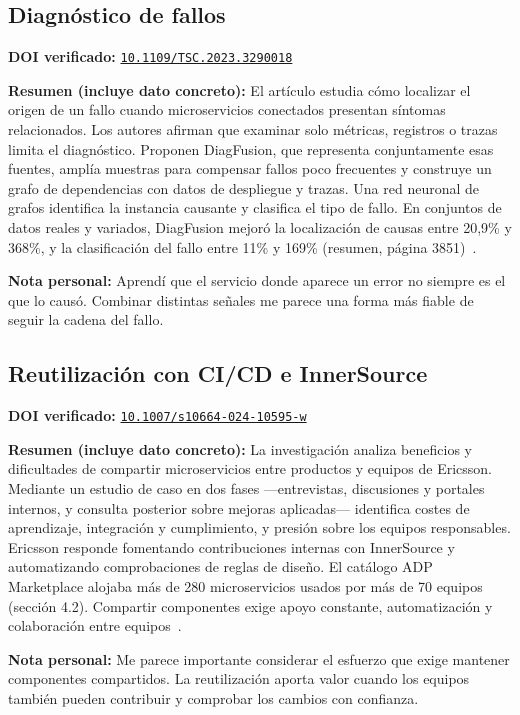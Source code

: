 \documentclass[12pt,a4paper]{article}
\begin{document}
\subsection{Diagnóstico de fallos}
\noindent\textbf{DOI verificado:} \href{https://doi.org/10.1109/TSC.2023.3290018}{\nolinkurl{10.1109/TSC.2023.3290018}}\par
\noindent\textbf{Resumen (incluye dato concreto):} El artículo estudia cómo localizar el origen de un fallo cuando microservicios conectados presentan síntomas relacionados. Los autores afirman que examinar solo métricas, registros o trazas limita el diagnóstico. Proponen DiagFusion, que representa conjuntamente esas fuentes, amplía muestras para compensar fallos poco frecuentes y construye un grafo de dependencias con datos de despliegue y trazas. Una red neuronal de grafos identifica la instancia causante y clasifica el tipo de fallo. En conjuntos de datos reales y variados, DiagFusion mejoró la localización de causas entre 20,9\% y 368\%, y la clasificación del fallo entre 11\% y 169\% (resumen, página 3851)~\cite{ZhangJinLinSunZhangXia2023}.\par
\noindent\textbf{Nota personal:} Aprendí que el servicio donde aparece un error no siempre es el que lo causó. Combinar distintas señales me parece una forma más fiable de seguir la cadena del fallo.\par

\subsection{Reutilización con CI/CD e InnerSource}
\noindent\textbf{DOI verificado:} \href{https://doi.org/10.1007/s10664-024-10595-w}{\nolinkurl{10.1007/s10664-024-10595-w}}\par
\noindent\textbf{Resumen (incluye dato concreto):} La investigación analiza beneficios y dificultades de compartir microservicios entre productos y equipos de Ericsson. Mediante un estudio de caso en dos fases —entrevistas, discusiones y portales internos, y consulta posterior sobre mejoras aplicadas— identifica costes de aprendizaje, integración y cumplimiento, y presión sobre los equipos responsables. Ericsson responde fomentando contribuciones internas con InnerSource y automatizando comprobaciones de reglas de diseño. El catálogo ADP Marketplace alojaba más de 280 microservicios usados por más de 70 equipos (sección 4.2). Compartir componentes exige apoyo constante, automatización y colaboración entre equipos~\cite{BadDeepUsMuhCheXin2025}.\par
\noindent\textbf{Nota personal:} Me parece importante considerar el esfuerzo que exige mantener componentes compartidos. La reutilización aporta valor cuando los equipos también pueden contribuir y comprobar los cambios con confianza.\par
\end{document}
